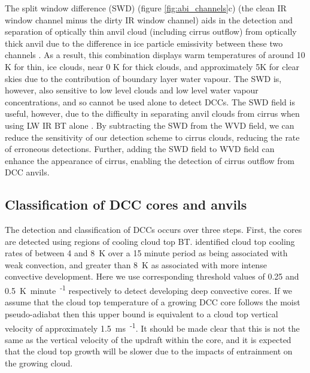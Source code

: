 The split window difference (SWD) (figure \ref{fig:abi_channels}c) (the clean IR window channel minus the dirty IR window channel) aids in the detection and separation of optically thin anvil cloud (including cirrus outflow) from optically thick anvil due to the difference in ice particle emissivity between these two channels \citep{heidinger_gazing_2009}.
As a result, this combination displays warm temperatures of around 10 \unit{K} for thin, ice clouds, near 0 \unit{K} for thick clouds, and approximately 5\unit{K} for clear skies due to the contribution of boundary layer water vapour.
The SWD is, however, also sensitive to low level clouds and low level water vapour concentrations, and so cannot be used alone to detect DCCs.
The SWD field is useful, however, due to the difficulty in separating anvil clouds from cirrus when using LW IR BT alone \citep{hong_detection_2005}. 
By subtracting the SWD from the WVD field, we can reduce the sensitivity of our detection scheme to cirrus clouds, reducing the rate of erroneous detections.
Further, adding the SWD field to WVD field can enhance the appearance of cirrus, enabling the detection of cirrus outflow  from DCC anvils.

\subsection{Classification of DCC cores and anvils}

The detection and classification of DCCs occurs over three steps.
First, the cores are detected using regions of cooling cloud top BT.
\citet{roberts_nowcasting_2003} identified cloud top cooling rates of between 4 and 8~\unit{K} over a 15 minute period as being associated with weak convection, and greater than 8~\unit{K} as associated with more intense convective development.
Here we use corresponding threshold values of 0.25 and 0.5~\unit{K minute\textsuperscript{-1}} respectively to detect developing deep convective cores.
If we assume that the cloud top temperature of a growing DCC core follows the moist pseudo-adiabat then this upper bound is equivalent to a cloud top vertical velocity of approximately 1.5~\unit{ms\textsuperscript{-1}}.
It should be made clear that this is not the same as the vertical velocity of the updraft within the core, and it is expected that the cloud top growth will be slower due to the impacts of entrainment on the growing cloud.

